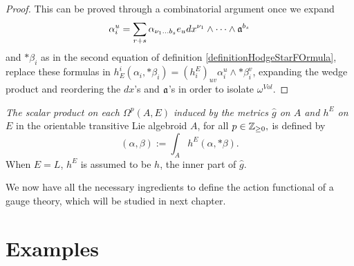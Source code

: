 \begin{proof}
This can be proved through a combinatorial argument once we expand $$\alpha_i^u = \sum_{r+s} \alpha_{\nu_1 \dots b_s} e_u dx^{\nu_1} \wedge \cdots \wedge \mathfrak{a}^{b_s}$$ and $*\beta_i$ as in the second equation of definition \ref{definitionHodgeStarFOrmula}, replace these formulas in $h^i_E(\alpha_i, *\beta_i) = (h^E_i)_{uv} \alpha_i^u \wedge * \beta_i^v$, expanding the wedge product and reordering the $dx$'s and $\mathfrak{a}$'s in order to isolate $\omega^{Vol}$.
\end{proof}

\begin{definition}
\emph{The scalar product on each $\Omega^p(A, E)$ induced by the metrics $\hat g$ on $A$ and $h^E$ on $E$} 
in the orientable transitive Lie algebroid $A$, for all $p \in \mathbb{Z}_{\geq 0},$ is defined by
\begin{equation*}
    (\alpha, \beta) := \int_A h^E(\alpha, *\beta).
\end{equation*}
When $E = L$, $h^E$ is assumed to be $h$, the inner part of $\hat g$.
\end{definition}


We now have all the necessary ingredients to define the action functional of a gauge theory, which will be studied in next chapter.

\section{Examples}
\label{chIntegrationSectionExamples}

